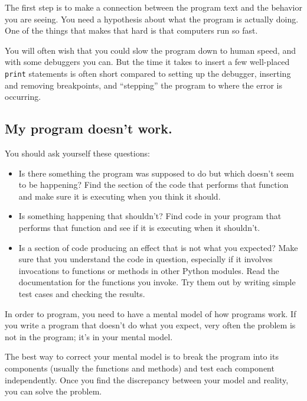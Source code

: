 \documentclass[10pt]{book}
\begin{document}
The first step is to make a connection between the program
text and the behavior you are seeing.  You need a hypothesis
about what the program is actually doing.  One of the things
that makes that hard is that computers run so fast.

You will often wish that you could slow the program down to human
speed, and with some debuggers you can.  But the time it takes to
insert a few well-placed {\tt print} statements is often short compared to
setting up the debugger, inserting and removing breakpoints, and
``stepping'' the program to where the error is occurring.

\subsection{My program doesn't work.}

You should ask yourself these questions:

\begin{itemize}

\item Is there something the program was supposed to do but
which doesn't seem to be happening?  Find the section of the code
that performs that function and make sure it is executing when
you think it should.

\item Is something happening that shouldn't?  Find code in
your program that performs that function and see if it is
executing when it shouldn't.

\item Is a section of code producing an effect that is not
what you expected?  Make sure that you understand the code in
question, especially if it involves invocations to functions or methods in
other Python modules.  Read the documentation for the functions you invoke.
Try them out by writing simple test cases and checking the results.

\end{itemize}

In order to program, you need to have a mental model of how
programs work.  If you write a program that doesn't do what you expect,
very often the problem is not in the program; it's in your mental
model.

The best way to correct your mental model is to break the program
into its components (usually the functions and methods) and test
each component independently.  Once you find the discrepancy
between your model and reality, you can solve the problem.
\end{document}
